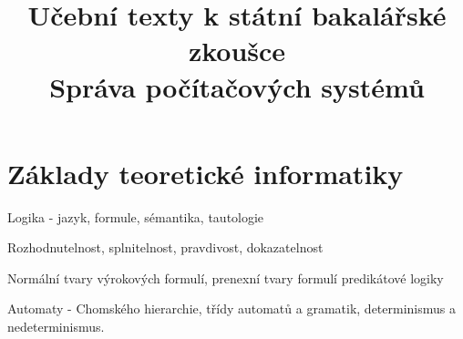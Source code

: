 \clearpage

\clearpage

\title{\LARGE Učební texty k státní bakalářské zkoušce \\ Správa počítačových systémů}




\maketitle

\clearpage

\clearpage

\tableofcontents

\newpage

\section{Základy teoretické informatiky}
\begin{pozadavky}
\begin{pitemize}
\item Logika - jazyk, formule, sémantika, tautologie
\item Rozhodnutelnost, splnitelnost, pravdivost, dokazatelnost
\item Normální tvary výrokových formulí, prenexní tvary formulí predikátové logiky
\item Automaty - Chomského hierarchie, třídy automatů a gramatik, determinismus a nedeterminismus.
\end{pitemize}
\end{pozadavky}





